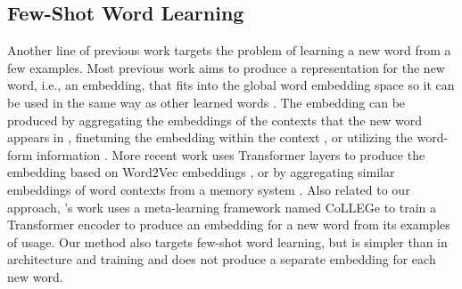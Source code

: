 \subsection{Few-Shot Word Learning}
\label{sec:related-work-few-shot-word-learning}
Another line of previous work targets the problem of learning a new word from a few examples.
Most previous work aims to produce a representation for the new word, i.e., an embedding, that fits into the global word embedding space so it can be used in the same way as other learned words \citep{Mikolov2013EfficientEO,Pennington2014GloVeGV}. The embedding can be produced by aggregating the embeddings of the contexts that the new word appears in \citep{Lazaridou2017MultimodalWM,khodak-etal-2018-la}, finetuning the embedding within the context \citep{herbelot-baroni-2017-high,Lampinen2017OneshotAF,hewitt2021initializing,kim-smolensky-2021-testing}, or utilizing the word-form information \citep{luong-etal-2013-better,schick2019learning}. %
More recent work uses Transformer layers to produce the embedding based on Word2Vec embeddings \citep[HiCE]{hu-etal-2019-shot}, or by aggregating similar embeddings of word contexts from a memory system \citep[Mem2Vec]{sun-etal-2018-memory}.
Also related to our approach, \citeauthor{Teehan2024CoLLEGeCE}'s \citeyearpar{Teehan2024CoLLEGeCE} work uses a meta-learning framework named CoLLEGe to train a Transformer encoder to produce an embedding for a new word from its examples of usage.
Our method also targets few-shot word learning, but is simpler than \citet{Teehan2024CoLLEGeCE} in architecture and training and does not produce a separate embedding for each new word.

